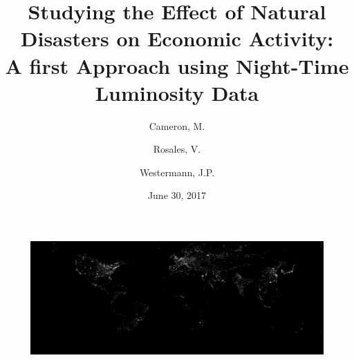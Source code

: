 \documentclass[12.5pt,fleqn,leqno,letterpaper]{article}
\title{
  Studying the Effect of Natural Disasters on Economic Activity:\\
  \large{A first Approach using Night-Time Luminosity Data}
}
\author{Cameron, M. \and Rosales, V. \and Westermann, J.P.}
\date{June 30, 2017}
\begin{document}
\maketitle
\begin{figure}[H]
  \centering
  \includegraphics[width=1\linewidth]{lum_2013}\label{lum_2013}
\end{figure}			
\newpage
\tableofcontents
\listoffigures
\listoftables

\newpage
\end{document}
